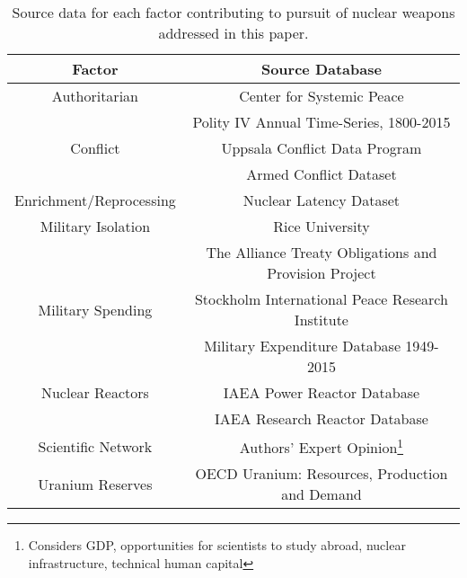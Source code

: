 \begin{table}
\centering
\begin{tabular}{|c|c|}
\hline
\textbf{Factor}        & \textbf{Source Database} \\
\hline
Authoritarian            & Center for Systemic Peace \\
                          & Polity IV Annual Time-Series, 1800-2015\cite{polity_scores}\\
\hline
Conflict & Uppsala Conflict Data Program \\
         & Armed Conflict Dataset\cite{conflict_ref} \\
\hline
Enrichment/Reprocessing   & Nuclear Latency Dataset \cite{latency_ref} \\
\hline
Military Isolation & Rice University \\
& The Alliance Treaty Obligations and Provision Project\cite{mil_iso}\\
\hline
Military Spending & Stockholm International Peace Research Institute \\
    & Military Expenditure Database 1949-2015\cite{mil_sp} \\
\hline
Nuclear Reactors           &  IAEA Power Reactor Database \cite{power_react}\\

                         & IAEA Research Reactor Database \cite{research_react}\\
\hline
Scientific Network     & Authors' Expert Opinion\footnote{Considers GDP, opportunities for scientists to study abroad, nuclear infrastructure, technical human capital} \\
\hline
Uranium Reserves  &    OECD Uranium: Resources, Production and Demand \cite{noauthor_uranium_2014} \\
\hline
\end{tabular}
\caption{Source data for each factor contributing to pursuit of nuclear weapons addressed in this paper.}
\label{tab:factor_sources}
\end{table}


